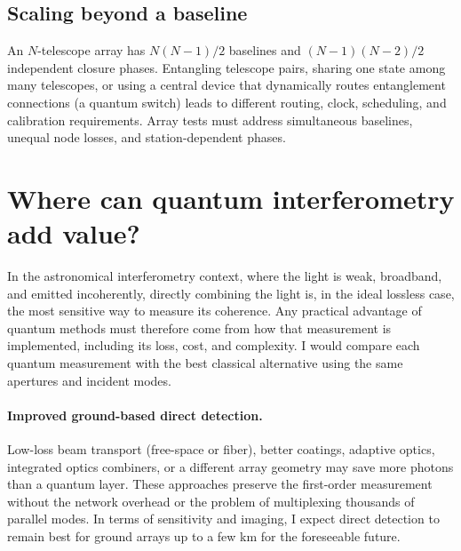 \documentclass[]{spie}
\begin{document}
\subsection{Scaling beyond a baseline}

An $N$-telescope array has $N(N-1)/2$ baselines and $(N-1)(N-2)/2$ independent closure phases. Entangling telescope pairs, sharing one state among many telescopes, or using a central device that dynamically routes entanglement connections (a quantum switch) leads to different routing, clock, scheduling, and calibration requirements. Array tests must address simultaneous baselines, unequal node losses, and station-dependent phases.

\section{Where can quantum interferometry add value?}
\label{sec:competition}

In the astronomical interferometry context, where the light is weak, broadband, and emitted incoherently, directly combining the light is, in the ideal lossless case, the most sensitive way to measure its coherence.\cite{Tsang2011} Any practical advantage of quantum methods must therefore come from how that measurement is implemented, including its loss, cost, and complexity. I would compare each quantum measurement with the best classical alternative using the same apertures and incident modes.

\paragraph{Improved ground-based direct detection.}
Low-loss beam transport (free-space or fiber), better coatings, adaptive optics, integrated optics combiners, or a different array geometry may save more photons than a quantum layer. These approaches preserve the first-order measurement without the network overhead or the problem of multiplexing thousands of parallel modes. In terms of sensitivity and imaging, I expect direct detection to remain best for ground arrays up to a few km for the foreseeable future.
\end{document}

